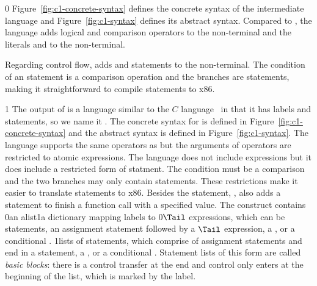 \documentclass[7x10,nocrop]{TimesAPriori_MIT}%
\def\racketEd{0}
\def\pythonEd{1}
\def\edition{0}
\newcommand{\racket}[1]{{\if\edition\racketEd{#1}\fi}}
\newcommand{\python}[1]{{\if\edition\pythonEd #1\fi}}
\begin{document}
{\if\edition\racketEd
%
Figure~\ref{fig:c1-concrete-syntax} defines the concrete syntax of the
\LangCIf{} intermediate language and Figure~\ref{fig:c1-syntax}
defines its abstract syntax. Compared to \LangCVar{}, the \LangCIf{}
language adds logical and comparison operators to the \Exp{}
non-terminal and the literals \TRUE{} and \FALSE{} to the \Arg{}
non-terminal.

Regarding control flow, \LangCIf{} adds  and 
statements to the \Tail{} non-terminal. The condition of an 
statement is a comparison operation and the branches are 
statements, making it straightforward to compile  statements
to x86.
%
\fi}
%
{\if\edition\pythonEd
%
The output of  is a language similar to the
$C$ language~\citep{Kernighan:1988nx} in that it has labels and
 statements, so we name it \LangCIf{}.  The
concrete syntax for \LangCIf{} is defined in
Figure~\ref{fig:c1-concrete-syntax}
and the abstract syntax is defined in Figure~\ref{fig:c1-syntax}.
%
The \LangCIf{} language supports the same operators as \LangIf{} but
the arguments of operators are restricted to atomic expressions. The
\LangCIf{} language does not include  expressions but it does
include a restricted form of  statment. The condition must be
a comparison and the two branches may only contain 
statements. These restrictions make it easier to translate 
statements to x86. 
%
\fi}
%
Besides the  statement, \LangCIf{}, also adds a
 statement to finish a function call with a specified value.
%
The  construct contains
%
\racket{an alist}\python{a dictionary}
%
mapping labels to
\racket{$\Tail$ expressions, which can be  statements,
an assignment statement followed by a $\Tail$ expression, a
\code{goto}, or a conditional .}
\python{lists of statements, which comprise of assignment statements
  and end in a \code{return} statement, a \code{goto}, or a
  conditional \code{goto}.
  \index{subject}{basic block}
  Statement lists of this form are called
  \emph{basic blocks}: there is a control transfer at the end and
  control only enters at the beginning of the list, which is marked by
  the label. }

\newcommand{\CifGrammarRacket}{
\begin{array}{lcl}
\Atm &::=& \itm{bool} \\
\itm{cmp} &::= & \code{eq?} \MID \code{<} \MID \code{<=} \MID \code{>} \MID \code{>=} \\
\Exp &::=& \CNOT{\Atm} \MID \LP \itm{cmp}~\Atm~\Atm\RP \\
\Tail &::= & \key{goto}~\itm{label}\key{;}\\
   &\MID& \key{if}~\LP \itm{cmp}~\Atm~\Atm \RP~ \key{goto}~\itm{label}\key{;} ~\key{else}~\key{goto}~\itm{label}\key{;} 
\end{array}
}
\end{document}
